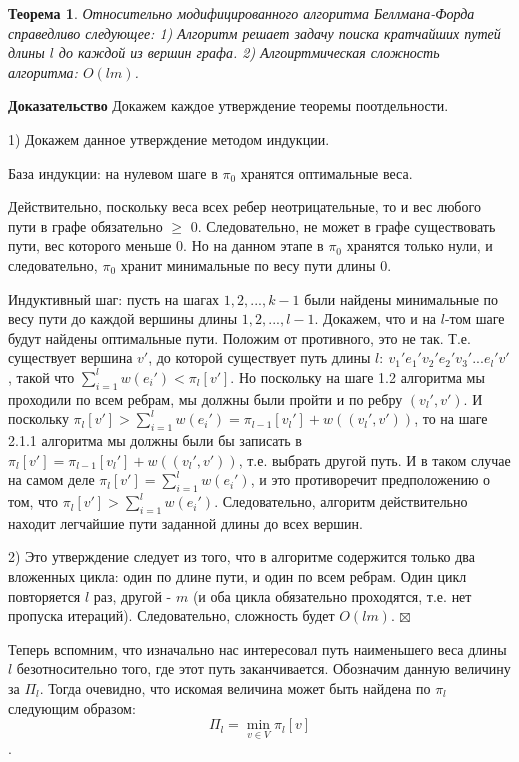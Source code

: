 \documentclass[a4paper,12pt]{extarticle}
\theoremstyle{plain} %
\newtheorem{theorem}{Теорема}
\begin{document}
\begin{large}
\begin{theorem}
Относительно модифицированного алгоритма Беллмана-Форда справедливо следующее:
1) Алгоритм решает задачу поиска кратчайших путей длины $l$ до каждой из вершин графа.
2) Алгоиртмическая сложность алгоритма: $O(lm)$.
\end{theorem}
\textbf{Доказательство}
Докажем каждое утверждение теоремы поотдельности.

1) Докажем данное утверждение методом индукции.

База индукции: на нулевом шаге в $\pi_0$ хранятся оптимальные веса.

Действительно, поскольку веса всех ребер неотрицательные, то и вес любого пути в графе обязательно $\ge$ 0. Следовательно, не может в графе существовать пути, вес которого меньше 0. Но на данном этапе в $\pi_0$ хранятся только нули, и следовательно, $\pi_0$ хранит минимальные по весу пути длины 0.

Индуктивный шаг: пусть на шагах $1, 2, ..., k-1$ были найдены минимальные по весу пути до каждой вершины длины $1, 2, ..., l-1$. Докажем, что и на $l$-том шаге будут найдены оптимальные пути. Положим от противного, это не так. Т.е. существует вершина $v'$, до которой существует путь длины $l: ~ v_1'e_1'v_2'e_2'v_3'...e_l'v'$, такой что $\sum_{i=1}^l w(e_i') < \pi_l[v']$. Но поскольку на шаге 1.2 алгоритма мы проходили по всем ребрам, мы должны были пройти и по ребру $(v_l', v')$. И поскольку $\pi_l[v'] > \sum_{i=1}^l w(e_i') = \pi_{l-1}[v_{l}'] + w( (v_l', v'))$, то на шаге 2.1.1 алгоритма мы должны были бы записать в $\pi_l[v'] = \pi_{l-1}[v_{l}'] + w( (v_l', v'))$, т.е. выбрать другой путь. И в таком случае на самом деле $\pi_l[v'] =  \sum_{i=1}^l w(e_i') $, и это противоречит предположению о том, что $\pi_l[v'] > \sum_{i=1}^l w(e_i')$. Следовательно, алгоритм действительно находит легчайшие пути заданной длины до всех вершин.

2) Это утверждение следует из того, что в алгоритме содержится только два вложенных цикла: один по длине пути, и один по всем ребрам. Один цикл повторяется $l$ раз, другой - $m$ (и оба цикла обязательно проходятся, т.е. нет пропуска итераций). Следовательно, сложность будет $O(lm)$.
$\boxtimes$

\bigskip

Теперь вспомним, что изначально нас интересовал путь наименьшего веса длины $l$ безотносительно того, где этот путь заканчивается. Обозначим данную величину за $\Pi_l$. Тогда очевидно, что искомая величина может быть найдена по $\pi_l$ следующим образом: $$\Pi_l = \min_{v \in V} \pi_l[v]$$.


\end{large}
\end{document}
